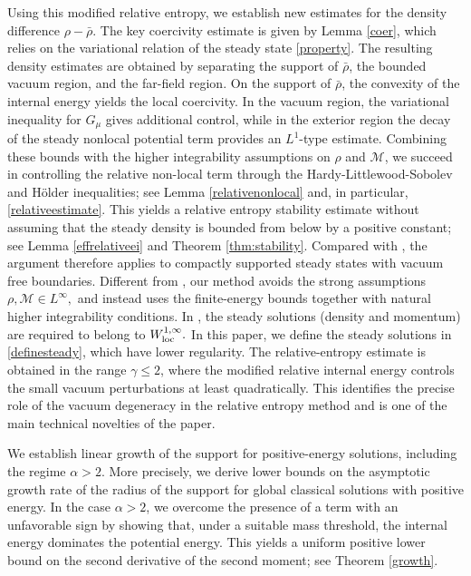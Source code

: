 \documentclass[reqno,11pt]{amsart}
\numberwithin{equation}{section}
\theoremstyle{definition}
\begin{document}
Using this modified relative entropy, we establish new estimates for the density
difference $\rho-\bar\rho$. The key coercivity estimate is given by Lemma \ref{coer}, which relies on the variational relation of the
steady state \eqref{property}. 
The resulting density estimates are obtained by separating the support of $\bar\rho$, the
bounded vacuum region, and the far-field region.  On the support of
$\bar\rho$, the convexity of the internal energy yields the local coercivity. In the
vacuum region, the variational inequality for $G_\mu$ gives additional control,
while in the exterior region the decay of the steady nonlocal potential term provides an
$L^1$-type estimate.  Combining these bounds with the higher integrability
assumptions on $\rho$ and $\mathcal M$, we succeed in controlling the relative non-local term
through the Hardy-Littlewood-Sobolev and H\"older inequalities; see Lemma \ref{relativenonlocal} and, in particular,
\eqref{relativeestimate}. This yields a relative entropy stability estimate without assuming that the
steady density is bounded from below by a positive constant; see
Lemma \ref{effrelativeei} and Theorem \ref{thm:stability}.  Compared with
\cite{Alves_2024}, the argument therefore applies to compactly supported
steady states with vacuum free boundaries.  Different from
\cite{Luo_2016_1}, our method avoids the strong assumptions
$\rho,\mathcal M\in L^\infty,$ 
and instead uses the finite-energy bounds together with natural higher
integrability conditions. In \cite{Luo_2016_1}, the steady solutions (density and momentum) are required to belong to $W^{1,\infty}_{{\rm loc}}.$  In this paper, we define the steady solutions in \eqref{definesteady}, which have lower regularity. The 
relative-entropy estimate is obtained in the range $\gamma\le2$,
where the modified relative internal energy controls the small vacuum
perturbations at least quadratically.  This identifies the precise role of the
vacuum degeneracy in the relative entropy method and is one of the main
technical novelties of the paper.
\smallskip

We establish linear growth of the support for positive-energy solutions, 
including the regime $\alpha>2$.
More precisely, we derive lower bounds on the asymptotic growth rate of the radius of 
the support for global classical solutions with positive energy. In the case 
$\alpha > 2$, we overcome the presence of a term with an unfavorable sign by showing that, 
under a suitable mass threshold, the internal energy dominates the potential energy. 
This yields a uniform positive lower bound on the second derivative of the second moment; 
see Theorem \ref{growth}.
\end{document}
